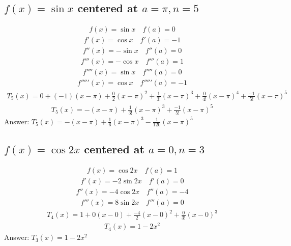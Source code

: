 \documentclass{article}
\begin{document}
\subsection{$f(x) = \sin{x}$ centered at $a = \pi, n = 5$}
\begin{align*}
	f(x) = \sin{x} \quad f(a) = 0
\end{align*}
\begin{align*}
	f'(x) = \cos{x} \quad f'(a) = -1
\end{align*}
\begin{align*}
	f''(x) = -\sin{x} \quad f''(a) = 0
\end{align*}
\begin{align*}
	f'''(x) = -\cos{x} \quad f'''(a) = 1
\end{align*}
\begin{align*}
	f''''(x) = \sin{x} \quad f''''(a) = 0
\end{align*}
\begin{align*}
	f'''''(x) = \cos{x} \quad f'''''(a) = -1
\end{align*}
\begin{align*}
	T_5(x) = 0 + (-1)(x - \pi) + \frac{0}{2} (x - \pi)^2 + \frac{1}{3!} (x - \pi)^3 + \frac{0}{4!} (x - \pi)^4 + \frac{-1}{5!} (x - \pi)^5
\end{align*}
\begin{align*}
	T_5(x) = -(x - \pi) + \frac{1}{3!} (x - \pi)^3 + \frac{-1}{5!} (x - \pi)^5
\end{align*}
Answer: $T_5 (x) = -(x- \pi) + \frac{1}{6} (x - \pi)^3 - \frac{1}{120} (x - \pi)^5$

\subsection{$f(x) = \cos{2x}$ centered at $a = 0, n = 3$}
\begin{align*}
	f(x) = \cos{2x} \quad f(a) = 1
\end{align*}
\begin{align*}
	f'(x) = -2\sin{2x} \quad f'(a) = 0
\end{align*}
\begin{align*}
	f''(x) = -4\cos{2x} \quad f''(a) = -4
\end{align*}
\begin{align*}
	f'''(x) = 8\sin{2x} \quad f'''(a) = 0
\end{align*}
\begin{align*}
	T_4(x) = 1 + 0(x - 0) + \frac{-4}{2}(x - 0)^2 + \frac{0}{3!} (x - 0)^3
\end{align*}
\begin{align*}
	T_4(x) = 1 - 2x^2
\end{align*}
Answer: $T_3 (x) = 1 - 2x^2$
\end{document}
